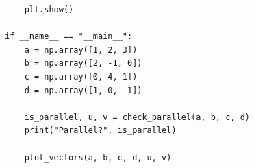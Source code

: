 \documentclass{beamer}
\theoremstyle{remark}
\numberwithin{equation}{section}
\begin{document}
\begin{frame}[fragile]
\begin{lstlisting}
    plt.show()

if __name__ == "__main__":
    a = np.array([1, 2, 3])
    b = np.array([2, -1, 0])
    c = np.array([0, 4, 1])
    d = np.array([1, 0, -1])

    is_parallel, u, v = check_parallel(a, b, c, d)
    print("Parallel?", is_parallel)

    plot_vectors(a, b, c, d, u, v)

\end{lstlisting}
\end{frame}
\end{document}
